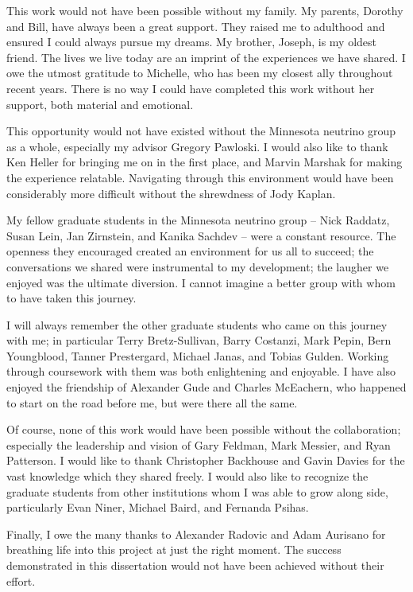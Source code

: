 
This work would not have been possible without my family.
My parents, Dorothy and Bill, have always been a great support.
They raised me to adulthood and ensured I could always pursue
my dreams.
My brother, Joseph, is my oldest friend.
The lives we live today are an imprint of the experiences we have shared.
I owe the utmost gratitude to Michelle, who has been my closest ally
throughout recent years.
There is no way I could have completed this work without her support,
both material and emotional.

This opportunity would not have existed without the Minnesota neutrino group
as a whole, especially my advisor Gregory Pawloski.
I would also like to thank Ken Heller for bringing me on in the first place,
and Marvin Marshak for making the experience relatable.
Navigating through this environment would have been considerably more
difficult without the shrewdness of Jody Kaplan.

My fellow graduate students in the Minnesota neutrino group -- Nick Raddatz,
Susan Lein, Jan Zirnstein, and Kanika Sachdev -- were a constant resource.
The openness they encouraged created an environment for us all to succeed;
the conversations we shared were instrumental to my development;
the laugher we enjoyed was the ultimate diversion.
I cannot imagine a better group with whom to have taken this journey.

I will always remember the other graduate students who
came on this journey with me; in particular
Terry Bretz-Sullivan, Barry Costanzi, Mark Pepin, Bern Youngblood,
Tanner Prestergard, Michael Janas, and Tobias Gulden.
Working through coursework with them was both enlightening and
enjoyable.
I have also enjoyed the friendship of Alexander Gude and Charles McEachern,
who happened to start on the road before me, but were there all the same.

Of course, none of this work would have been possible without the \nova
collaboration; especially the leadership and vision of Gary Feldman,
Mark Messier, and Ryan Patterson.
I would like to thank Christopher Backhouse and Gavin Davies
for the vast knowledge which they shared freely.
I would also like to recognize the graduate students from
other institutions whom I was able to grow along side, particularly
Evan Niner, Michael Baird, and Fernanda Psihas.

Finally, I owe the many thanks to Alexander Radovic and Adam Aurisano
for breathing life into this project at just the right moment.
The success demonstrated in this dissertation
would not have been achieved without their effort.

